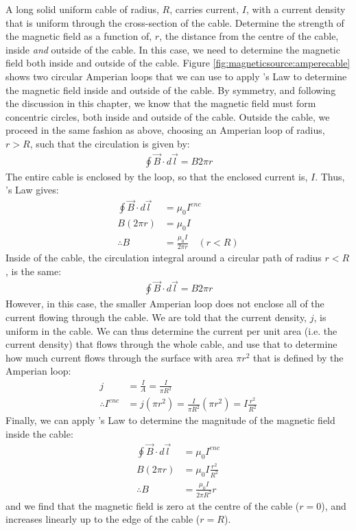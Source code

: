 \begin{example}{A long solid uniform cable of radius, $R$, carries current, $I$, with a current density that is uniform through the cross-section of the cable. Determine the strength of the magnetic field as a function of, $r$, the distance from the centre of the cable, inside \textit{and} outside of the cable.}
In this case, we need to determine the magnetic field both inside and outside of the cable. Figure \ref{fig:magneticsource:amperecable} shows two circular Amperian loops that we can use to apply \ampere's Law to determine the magnetic field inside and outside of the cable.
By symmetry, and following the discussion in this chapter, we know that the magnetic field must form concentric circles, both inside and outside of the cable. Outside the cable, we proceed in the same fashion as above, choosing an Amperian loop of radius, $r>R$, such that the circulation is given by:
\begin{align*}
\oint \vec B \cdot d\vec l= B 2\pi r
\end{align*}
The entire cable is enclosed by the loop, so that the enclosed current is, $I$. Thus, \ampere's Law gives:
\begin{align*}
\oint \vec B \cdot d\vec l &=\mu_0 I^{enc}\\
B (2\pi r) &= \mu_0 I\\
\therefore B &= \frac{\mu_0 I}{2\pi r}\quad(r<R)
\end{align*} 
Inside of the cable, the circulation integral around a circular path of radius $r<R$, is the same:
\begin{align*}
\oint \vec B \cdot d\vec l= B 2\pi r
\end{align*}
However, in this case, the smaller Amperian loop does not enclose all of the current flowing through the cable. We are told that the current density, $j$, is uniform in the cable. We can thus determine the current per unit area (i.e. the current density) that flows through the whole cable, and use that to determine how much current flows through the surface with area $\pi r^2$ that is defined by the Amperian loop:
\begin{align*}
j &= \frac{I}{A}=\frac{I}{\pi R^2}\\
\therefore I^{enc} &= j(\pi r^2) = \frac{I}{\pi R^2}(\pi r^2)=I\frac{r^2}{R^2}
\end{align*}
Finally, we can apply \ampere's Law to determine the magnitude of the magnetic field inside the cable:
\begin{align*}
\oint \vec B \cdot d\vec l &=\mu_0 I^{enc}\\
B (2\pi r) &= \mu_0 I\frac{r^2}{R^2}\\
\therefore B &= \frac{\mu_0 I}{2\pi R^2}r
\end{align*}
and we find that the magnetic field is zero at the centre of the cable ($r=0$), and increases linearly up to the edge of the cable ($r=R$).


\end{example}
